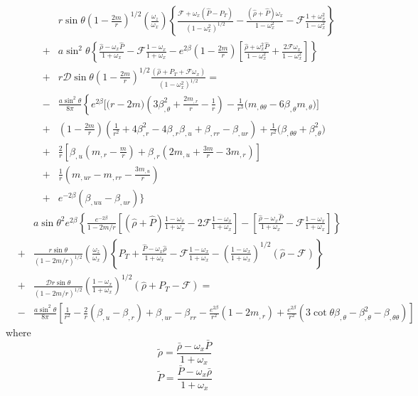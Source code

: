 \documentclass[twocolumn,superscriptaddress]{revtex4}
\begin{document}
\begin{widetext}
\begin{eqnarray}
&&r{\sin\theta}\left(1-\frac{2m}{r}\right)^{1/2}\left(\frac{\omega_z}{\omega_x}\right)\left\{
\frac{\mathcal{F}+\omega_x(\hat P-P_T)}{(1-\omega_x^2)^{1/2}}
-\frac{(\hat\rho+\hat P)\omega_x}{1-\omega_x^2}-\mathcal{F}\frac{1+\omega_x^2}{1-\omega_x^2}\right\}\nonumber\\
&+& a \sin^2\theta\left\{ \frac{\hat\rho-\omega_x \hat P}{1+\omega_x}-\mathcal{F}\frac{1-\omega_x}{1+\omega_x} -e^{2\beta}\left(1-\frac{2m}{r}\right)\left[\frac{\hat\rho+\omega_x^2\hat P}{1-\omega_x^2}+\frac{2\mathcal{F}\omega_x}{1-\omega_x^2}\right]\right\}\nonumber\\
&+&r\mathcal{D}\sin\theta \left(1-\frac{2m}{r}\right)^{1/2} \frac{(\hat\rho+P_T+\mathcal{F}\omega_x)}{(1-\omega_x^2)^{1/2}}=\nonumber \\
&-& \frac{a\sin^2\theta }{8\pi}\left\{e^{2\beta}\bigg[\bigg(r-2m\bigg)\left(3\beta_{,\theta}^2+\frac{2m_{,r}}{r}-\frac{1}{r}\right)-\frac{1}{r^3}\bigg(m_{,\theta\theta}-6\beta_{,\theta}m_{,\theta}\bigg)\bigg]\right. \nonumber \\
&+&\left(1-\frac{2m}{r}\right)\left(\frac{1}{r^2}+4\beta_{,r}^2-4\beta_{,r}\beta_{,u}+\beta_{,rr}-\beta_{,ur}\right) + \frac{1}{r^2}\bigg(\beta_{,\theta\theta}+\beta_{,\theta}^2\bigg)\nonumber\\
&+&\frac{2}{r}\left[\beta_{,u}\left(m_{,r}-\frac{m}{r}\right)+\beta_{,r}\left(2m_{,u}+\frac{3m}{r}-3m_{,r}\right)\right] \nonumber \\
&+& \frac{1}{r}\left(m_{,ur}-m_{,rr}-\frac{3m_{,u}}{r}\right)\nonumber \\
&+& e^{-2\beta}(\beta_{,uu}-\beta_{,ur})\bigg\}
\end{eqnarray}
\begin{eqnarray}
&&a\sin\theta^2 e^{2\beta}\left\{ \frac{e^{-2\beta}}{1-2m/r}\left[(\hat\rho+\hat P)\frac{1-\omega_x}{1+\omega_x}-2\mathcal{F}\frac{1-\omega_x}{1+\omega_x}\right]-\left[\frac{\hat\rho-\omega_x\hat P}{1+\omega_x}-\mathcal{F}\frac{1-\omega_x}{1+\omega_x}\right]\right\}\nonumber\\
&+& \frac{r\sin\theta}{(1-2m/r)^{1/2}}\left(\frac{\omega_z}{\omega_x}\right)\left\{ P_T + \frac{\hat P-\omega_x\hat\rho}{1+\omega_x}-\mathcal{F}\frac{1-\omega_x}{1+\omega_x}-\left(\frac{1-\omega_x}{1+\omega_x}\right)^{1/2}{(\hat\rho-\mathcal{F})}\right\}\nonumber\\
&+&\frac{\mathcal{D}r\sin\theta}{(1-2m/r)^{1/2}} \left(\frac{1-\omega_x}{1+\omega_x}\right)^{1/2} (\hat\rho+P_T-\mathcal{F})=\nonumber \\
&-&\frac{a\sin^2\theta}{8\pi}\left[\frac{1}{r^2}-\frac{2}{r}\left(\beta_{,u}-\beta_{,r}\right)+\beta_{,ur}-\beta_{rr} -\frac{e^{2\beta}}{r^2}\left(1-2m_{,r}\right) + \frac{e^{2\beta}}{r^2}(3\cot\theta\beta_{,\theta}-\beta_{,\theta}^2-\beta_{,\theta\theta})\right]
\end{eqnarray}
where 
\begin{equation}
\tilde \rho=\frac{\bar\rho-\omega_x \bar P}{1+\omega_x}
\end{equation}
\begin{equation}
\tilde P=\frac{\bar P-\omega_x \bar\rho}{1+\omega_x}
\end{equation}
\end{widetext}

\end{document}
